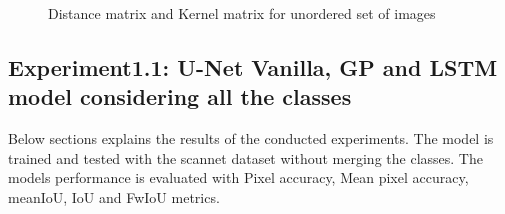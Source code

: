 	\begin{figure}
		\centering
		\qquad
		\caption{Distance matrix and Kernel matrix for unordered set of images}%
		\label{fig:unordered_D_and_K}%
	\end{figure}
	

    \subsection{Experiment1.1: U-Net Vanilla, GP and LSTM model considering all the classes}
    
    Below sections explains the results of the conducted experiments. The model is trained and tested with the scannet dataset without merging the classes. The models performance is evaluated with Pixel accuracy, Mean pixel accuracy, meanIoU, IoU and FwIoU metrics.
    
